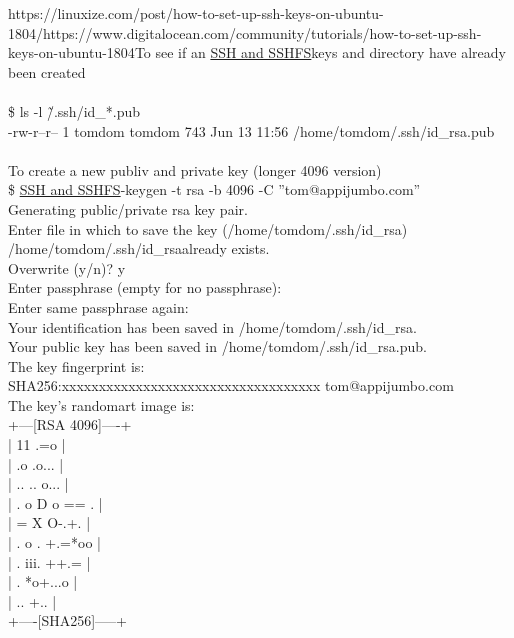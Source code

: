 \documentclass[10pt,a4paper]{article}
\begin{document}
https://linuxize.com/post/how-to-set-up-ssh-keys-on-ubuntu-1804/https://www.digitalocean.com/community/tutorials/how-to-set-up-ssh-keys-on-ubuntu-1804{\large To see if an \hyperlink{ssh___and_sshfs}{SSH   and SSHFS}}{\large  keys and directory have already been created\\
\\
\$ ls -l \~/.ssh/id\_*.pub}{\large \\
-rw-r--r-- 1 tomdom tomdom 743 Jun 13 11:56 /home/tomdom/.ssh/id\_rsa.pub}{\large \\
\\
To create a new publiv and private key (longer 4096 version)\\
\$ \hyperlink{ssh___and_sshfs}{SSH   and SSHFS}}{\large -keygen -t rsa -b 4096 -C ''tom@appijumbo.com''}{\large \\
	Generating public/private rsa key pair.\\
	Enter file in which to save the key (/home/tomdom/.ssh/id\_rsa}{\large )\\
	/home/tomdom/.ssh/id\_rsa}{\large  already exists.\\
	Overwrite (y/n)? y\\
	Enter passphrase (empty for no passphrase): \\
	Enter same passphrase again: \\
	Your identification has been saved in /home/tomdom/.ssh/id\_rsa.}{\large \\
	Your public key has been saved in /home/tomdom/.ssh/id\_rsa.pub.}{\large \\
	The key fingerprint is:\\
	SHA256:xxxxxxxxxxxxxxxxxxxxxxxxxxxxxxxxxxx tom@appijumbo.com}{\large \\
	The key's randomart image is:\\
	+---[RSA 4096]----+\\
	|       11  .=o   		|\\
	|       .o .o...  		|\\
	|      .. .. o... 		|\\
	|     . o D o == .	|\\
	|      = X   O-.+.	|\\
	|     . o . +.=*oo	|\\
	|    .  iii. ++.= 	|\\
	|     .  *o+...o  		|\\
	|      .. +..     		|\\
	+----[SHA256]-----+\\
\\
}
\end{document}

